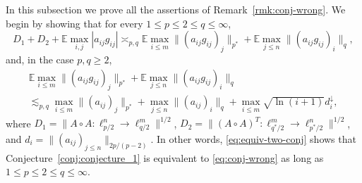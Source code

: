 \documentclass[a4paper]{amsart}
\theoremstyle{definition}
\theoremstyle{remark}
\numberwithin{equation}{section}
\newcommand*{\EE}{\mathbb{E}}
\newcommand*{\hadprod}{\mathbin{\circ}} %
\newcommand*{\rearr}{\downarrow} %
\begin{document}
In this subsection we prove all the assertions of Remark~\ref{rmk:conj-wrong}. 
We begin by showing that for every $1\le p \le 2\le q \le \infty$, 
\begin{equation}	\label{eq:equiv-two-conj}
	D_1+D_2+ \EE \max_{i,j}|a_{ij}g_{ij}| \asymp_{p,q} \EE\max_{i\le m} \| (a_{ij}g_{ij})_j\|_{p^\ast} +\EE\max_{j\le n}  \| (a_{ij}g_{ij})_i\|_q,
\end{equation}
and,  in the case  $p,q\ge 2$,
\begin{multline} 	\label{eq:upper-exp-max-random}
	\EE\max_{i\le m} \| (a_{ij}g_{ij})_j\|_{p^\ast} +\EE\max_{j\le n}  \| (a_{ij}g_{ij})_i\|_q 
		\\
		\lesssim_{p,q}
		\max _{i\le m} \| (a_{ij})_j\|_{p^\ast} +\max_{j\le n}  \| (a_{ij})_i\|_q +\max_{i\le m} \sqrt{\ln(i+1)}d_i^{\rearr{}},
\end{multline}
where $ D_1  = \|A\hadprod A \colon \ell^n_{p/2} \to \ell^m_{q/2}\|^{1/2}$, $D_2  = \|(A\hadprod A)^T \colon \ell^m_{q^*/2} \to \ell^n_{p^*/2}\|^{1/2}$, and $d_i = \|(a_{ij})_{j\le n} \|_{2p/(p-2)}$. 
In other words, \eqref{eq:equiv-two-conj} shows that Conjecture~\ref{conj:conjecture_1} is equivalent to \eqref{eq:conj-wrong} as long as $1\le p \le 2\le q \le \infty$.
\end{document}
